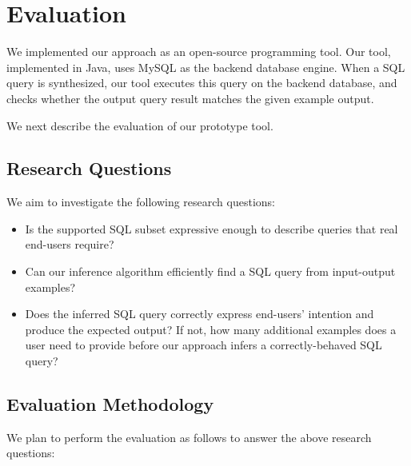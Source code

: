 
\section{Evaluation}
\label{sec:evaluation}

We implemented our approach as an open-source programming tool. Our tool, implemented
in Java, uses MySQL as the backend database engine. When a SQL query is synthesized,
our tool executes this query on the backend database, and checks whether the output
query result matches the given example output.

We next describe the evaluation of our prototype tool.

\subsection{Research Questions}

We aim to investigate the following research questions:

\begin{itemize}
\item Is the supported SQL subset expressive enough to describe
queries that real end-users require?

\item Can our inference algorithm efficiently find a SQL query
from input-output examples?

\item Does the inferred SQL query correctly express end-users'
intention and produce the expected output? If not, how many
additional examples does a user need to provide before our
approach infers a correctly-behaved SQL query?

\end{itemize}

\subsection{Evaluation Methodology}

We plan to perform the evaluation as follows to answer the
above research questions:

